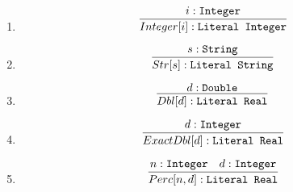 \begin{enumerate}

    \item \[ \infer{\ofTy{Integer[i]}{Literal Integer}}{\ofTy{i}{Integer}} \]
    \item \[ \infer{\ofTy{Str[s]}{Literal String}}{\ofTy{s}{String}} \]
    \item \[ \infer{\ofTy{Dbl[d]}{Literal Real}}{\ofTy{d}{Double}} \]
    \item \[ \infer{\ofTy{ExactDbl[d]}{Literal Real}}{\ofTy{d}{Integer}} \]
    \item \[ \infer{\ofTy{Perc[n,d]}{Literal Real}}{\ofTy{n}{Integer} & \ofTy{d}{Integer}} \]

\end{enumerate}
